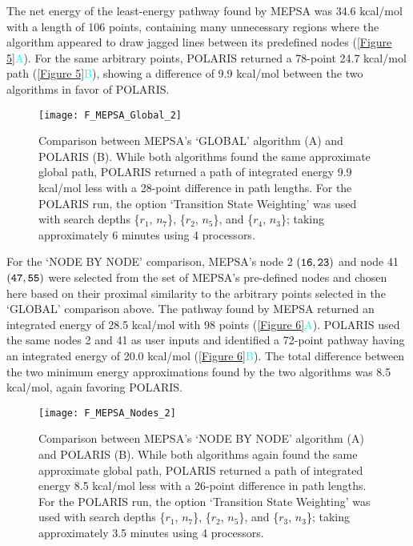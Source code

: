 \documentclass[twocolumn]{biophys-new}
\begin{document}
The net energy of the least-energy pathway found by MEPSA was 34.6 kcal/mol with a length of 106 points, containing many unnecessary regions where the algorithm appeared to draw jagged lines between its predefined nodes (\autoref{Figure 5}\textcolor{cyan}{A}). For the same arbitrary points, POLARIS returned a 78-point 24.7 kcal/mol path (\autoref{Figure 5}\textcolor{cyan}{B}), showing a difference of 9.9 kcal/mol between the two algorithms in favor of POLARIS.

\setcounter{figure}{4} 
\begin{figure}[hbt!]
\centering
\texttt{[image: F\_MEPSA\_Global\_2]}
\caption{Comparison between MEPSA's `GLOBAL' algorithm (A) and POLARIS (B). While both algorithms found the same approximate global path, POLARIS returned a path of integrated energy 9.9 kcal/mol less with a 28-point difference in path lengths. For the POLARIS run, the option `Transition State Weighting' was used with search depths \{$r_{1}$, $n_{7}$\}, \{$r_{2}$, $n_{5}$\}, and \{$r_{4}$, $n_{3}$\}; taking approximately 6 minutes using 4 processors.}
\label{Figure 5}
\end{figure}

For the `NODE BY NODE' comparison, MEPSA's node 2 $\tt{(16, 23)}$ and node 41 $\tt{(47, 55)}$ were selected from the set of MEPSA's pre-defined nodes and chosen here based on their proximal similarity to the arbitrary points selected in the `GLOBAL' comparison above. The pathway found by MEPSA returned an integrated energy of 28.5 kcal/mol with 98 points (\autoref{Figure 6}\textcolor{cyan}{A}). POLARIS used the same nodes 2 and 41 as user inputs and identified a 72-point pathway having an integrated energy of 20.0 kcal/mol (\autoref{Figure 6}\textcolor{cyan}{B}). The total difference between the two minimum energy approximations found by the two algorithms was 8.5 kcal/mol, again favoring POLARIS.

\setcounter{figure}{5} 
\begin{figure}[hbt!]
\centering
\texttt{[image: F\_MEPSA\_Nodes\_2]}
\caption{Comparison between MEPSA's `NODE BY NODE' algorithm (A) and POLARIS (B). While both algorithms again found the same approximate global path, POLARIS returned a path of integrated energy 8.5 kcal/mol less with a 26-point difference in path lengths. For the POLARIS run, the option `Transition State Weighting' was used with search depths \{$r_{1}$, $n_{7}$\}, \{$r_{2}$, $n_{5}$\}, and \{$r_{3}$, $n_{3}$\}; taking approximately 3.5 minutes using 4 processors.}
\label{Figure 6}
\end{figure}
\end{document}
